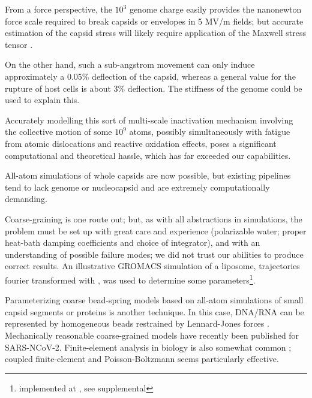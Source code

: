\documentclass[paper.tex]{subfiles}
\begin{document}
\begin{multicols}{1}
From a force perspective, the $10^3$ genome charge easily provides the nanonewton force scale required\cite{Bacteriophage2004} to break capsids or envelopes in 5 MV/m fields; but accurate estimation of the capsid stress will likely require application of the Maxwell stress tensor \cite{Electrostatic2013}\cite{Deformation1991}.

On the other hand, such a sub-angstrom movement can only induce approximately a 0.05\% deflection of the capsid, whereas a general value for the rupture of host cells is about 3\% deflection\cite{Electromechanical1989}. The stiffness of the genome could be used to explain this. 

Accurately modelling this sort of multi-scale inactivation mechanism involving the collective motion of some $10^9$ atoms, possibly simultaneously with fatigue from atomic dislocations\cite{Physical2010} and reactive oxidation effects, poses a significant computational and theoretical hassle, which has far exceeded our capabilities.

All-atom simulations of whole capsids are now possible, but existing pipelines tend to lack genome or nucleocapsid\cite{Mesoscale2020}\cite{Physical2017} and are extremely computationally demanding.

Coarse-graining is one route out; but, as with all abstractions in simulations, the problem must be set up with great care and experience (polarizable water; proper heat-bath damping coefficients and choice of integrator)\cite{Membrane2016}\cite{Determining2014}, and with an understanding of possible failure modes; we did not trust our abilities to produce correct results. An illustrative GROMACS simulation of a liposome, trajectories fourier transformed with \cite{TRAVIS2011}, was used to determine some parameters\footnote{implemented at , see supplemental}.

Parameterizing coarse bead-spring models based on all-atom simulations of small capsid segments or proteins \cite{Elucidating2009} is another technique. In this case, DNA/RNA can be represented by homogeneous beads restrained by Lennard-Jones forces \cite{Communication2013}. Mechanically reasonable coarse-grained models have recently been published for SARS-NCoV-2\cite{Multiscale2020}. Finite-element analysis in biology is also somewhat common \cite{Finite2007}; coupled finite-element and Poisson-Boltzmann\cite{Electrostatic2020a} seems particularly effective.



\end{multicols}
\end{document}
